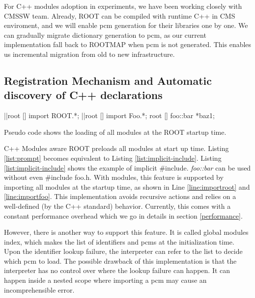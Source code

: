\documentclass{webofc}
\begin{document}
For C++ modules adoption in experiments, we have been working closely with CMSSW team. Already, ROOT can be compiled with runtime C++ in CMS enviroment, and we will enable pcm generation for their libraries one by one. We can gradually migrate dictionary generation to pcm, as our current implementation fall back to ROOTMAP when pcm is not generated. This enables us incremental migration from old to new infrastructure.

\subsection{Registration Mechanism and Automatic discovery of C++ declarations}
\label{subsec:preloading}

\begin{listing}[h]
    \noindent
    \begin{minipage}[h]{.7\textwidth}
    \begin{cppcode*}{}
    |\label{line:importroot}|root [] import ROOT.*;
    |\label{line:importfoo}|root [] import Foo.*;
    root [] foo::bar *baz1;
    \end{cppcode*}
    \end{minipage}
    \caption{Pseudo code shows the loading of all modules at the ROOT startup time.}
    \label{list:implicit-include}
\end{listing}

C++ Modules aware ROOT preloads all modules at start up time. Listing \ref{list:prompt} becomes equivalent to Listing \ref{list:implicit-include}. Listing \ref{list:implicit-include} shows the example of implicit \#include. {\it foo::bar} can be used without even \#include foo.h. With modules, this feature is supported by importing all modules at the startup time, as shown in Line \ref{line:importroot} and \ref{line:importfoo}. This implementation avoids recursive actions and relies on a well-defined (by the C++ standard) behavior. Currently, this comes with a constant performance overhead which we go in details in section \ref{performance}.

However, there is another way to support this feature. It is called global modules index, which makes the list of identifiers and pcms at the initialization time. Upon the identifier lookup failure, the interpreter can refer to the list to decide which pcm to load. The possible drawback of this implementation is that the interpreter has no control over where the lookup failure can happen. It can happen inside a nested scope where importing a pcm may cause an incomprehensible error.
\end{document}
